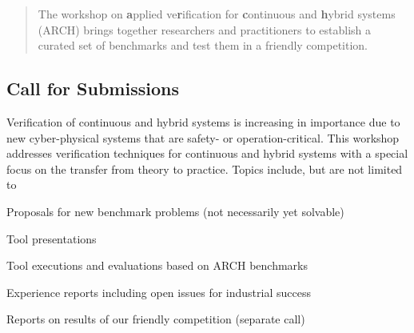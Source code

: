 \documentclass[a4paper,10pt]{article}
\newenvironment{packed_itemize}{
\begin{itemize}
  \setlength{\itemsep}{2pt}
  \setlength{\parskip}{0pt}
  \setlength{\parsep}{0pt}
}{\end{itemize}}
\begin{document}
%

\vspace{-1cm}

\begin{abstract}
\noindent
The workshop on \textbf{a}pplied ve\textbf{r}ification for \textbf{c}ontinuous and \textbf{h}ybrid systems (ARCH) brings together researchers and practitioners to establish a curated set of benchmarks and test them in a friendly competition. 

\end{abstract}

\subsection*{Call for Submissions} %

Verification of continuous and hybrid systems is increasing in importance due to new cyber-physical systems that are safety- or operation-critical. This workshop addresses verification techniques for continuous and hybrid systems with a special focus on the transfer from theory to practice. Topics include, but are not limited to
\begin{packed_itemize}
\item Proposals for new benchmark problems (not necessarily yet solvable)
\item Tool presentations
\item Tool executions and evaluations based on ARCH benchmarks
\item Experience reports including open issues for industrial success
\item Reports on results of our friendly competition (separate call)
\end{packed_itemize}
\end{document}
